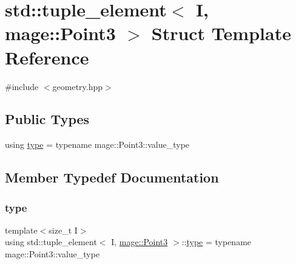 \hypertarget{structstd_1_1tuple__element_3_01_i_00_01mage_1_1_point3_01_4}{}\section{std\+:\+:tuple\+\_\+element$<$ I, mage\+:\+:Point3 $>$ Struct Template Reference}
\label{structstd_1_1tuple__element_3_01_i_00_01mage_1_1_point3_01_4}


{\ttfamily \#include $<$geometry.\+hpp$>$}

\subsection*{Public Types}
\begin{DoxyCompactItemize}
\item 
using \mbox{\hyperlink{structstd_1_1tuple__element_3_01_i_00_01mage_1_1_point3_01_4_a3a2128442434af529b2eb94f631fb259}{type}} = typename mage\+::\+Point3\+::value\+\_\+type
\end{DoxyCompactItemize}


\subsection{Member Typedef Documentation}
\mbox{\label{structstd_1_1tuple__element_3_01_i_00_01mage_1_1_point3_01_4_a3a2128442434af529b2eb94f631fb259}} 
\subsubsection{\texorpdfstring{type}{type}}
{\footnotesize\ttfamily template$<$size\+\_\+t I$>$ \\
using std\+::tuple\+\_\+element$<$ I, \mbox{\hyperlink{structmage_1_1_point3}{mage\+::\+Point3}} $>$\+::\mbox{\hyperlink{structstd_1_1tuple__element_3_01_i_00_01mage_1_1_point3_01_4_a3a2128442434af529b2eb94f631fb259}{type}} =  typename mage\+::\+Point3\+::value\+\_\+type}

